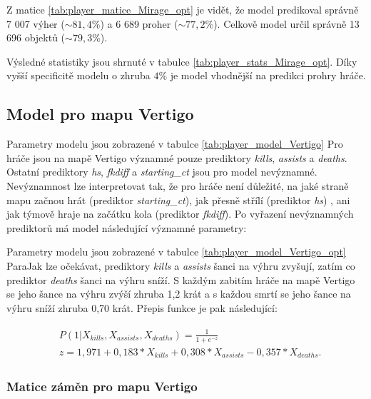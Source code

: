 

Z matice \ref{tab:player_matice_Mirage_opt} je vidět, že
model predikoval správně 7 007 výher ($\sim 81,4\%$) a 6 689 proher ($\sim 77,2\%$). Celkově model určil správně 13 696 objektů ($\sim 79,3\%$).



Výsledné statistiky jsou shrnuté v tabulce \ref{tab:player_stats_Mirage_opt}. Díky vyšší specificitě modelu o zhruba $4\%$ je model
vhodnější na predikci prohry hráče.

\subsection{Model pro mapu Vertigo}



Parametry modelu jsou zobrazené v tabulce \ref{tab:player_model_Vertigo}
Pro hráče jsou na mapě Vertigo významné pouze prediktory \textit{kills}, \textit{assists} a \textit{deaths}. Ostatní prediktory \textit{hs}, \textit{fkdiff} a \textit{starting\_ct}
jsou pro model nevýznamné. Nevýznamnost lze interpretovat tak, že pro hráče není důležité, na jaké straně mapu začnou hrát (prediktor  \textit{starting\_ct}), jak přesně
střílí (prediktor \textit{hs})
, ani jak týmově hraje na začátku kola (prediktor \textit{fkdiff}).
Po vyřazení nevýznamných prediktorů má model následující významné parametry:



Parametry modelu jsou zobrazené v tabulce \ref{tab:player_model_Vertigo_opt}
ParaJak lze očekávat, prediktory \textit{kills} a \textit{assists} šanci na výhru zvyšují, zatím co prediktor \textit{deaths} šanci na výhru sníží. S každým zabitím hráče
na mapě Vertigo se jeho šance na výhru zvýší zhruba 1,2 krát a s každou smrtí se jeho šance na výhru sníží zhruba 0,70 krát.
Přepis funkce je pak následující:

\begin{align*}
    \begin{split}
        &P(1 | X_{kills}, X_{assists}, X_{deaths}) = \frac{1}{1 + e^{-z}} \\
        &z = 1,971 + 0,183*X_{kills} + 0,308*X_{assists} - 0,357*X_{deaths}.
    \end{split}
\end{align*}

\subsubsection{Matice záměn pro mapu Vertigo}


